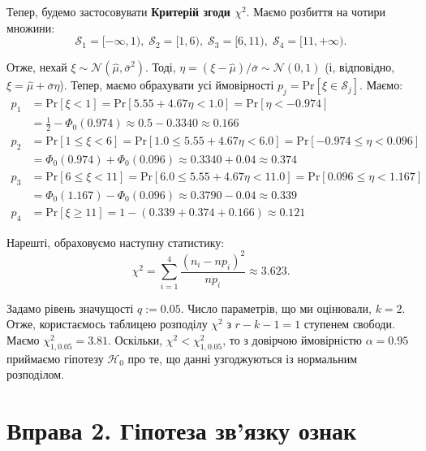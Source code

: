 \documentclass{../hw_template}
\begin{document}
Тепер, будемо застосовувати \textbf{Критерій згоди $\chi^2$}. Маємо розбиття на чотири множини: 
\begin{equation*}
    \mathcal{S}_1 =
[-\infty,1),\; \mathcal{S}_2 = [1,6),\; \mathcal{S}_3=[6,11),\;
\mathcal{S}_4=[11,+\infty).    
\end{equation*}

Отже, нехай $\xi \sim \mathcal{N}(\hat{\mu},\overline{\sigma}^2)$. Тоді, $\eta = (\xi - \hat{\mu})/\overline{\sigma} \sim \mathcal{N}(0,1)$ (і, відповідно, $\xi=\hat{\mu}+\overline{\sigma}\eta$). Тепер, маємо обрахувати усі ймовірності $p_j = \text{Pr}[\xi \in \mathcal{S}_j]$. Маємо:
\begin{align*}
    p_1 &= \text{Pr}[\xi < 1] = \text{Pr}[5.55 + 4.67\eta < 1.0] = \text{Pr}[\eta < -0.974] \\ 
        &= \frac{1}{2} - \Phi_0(0.974) \approx 0.5 - 0.3340 \approx 0.166 \\
    p_2 &= \text{Pr}[1 \leq \xi < 6] = \text{Pr}[1.0 \leq 5.55 + 4.67\eta < 6.0] = \text{Pr}[-0.974 \leq \eta < 0.096] \\
        &= \Phi_0(0.974) + \Phi_0(0.096) \approx 0.3340 + 0.04 \approx 0.374 \\
    p_3 &= \text{Pr}[6 \leq \xi < 11] = \text{Pr}[6.0 \leq 5.55 + 4.67\eta < 11.0] = \text{Pr}[0.096 \leq \eta < 1.167] \\
        &= \Phi_0(1.167) - \Phi_0(0.096) \approx 0.3790 - 0.04 \approx 0.339 \\
    p_4 &= \text{Pr}[\xi \geq 11] = 1 - (0.339 + 0.374 + 0.166) \approx 0.121
\end{align*}

Нарешті, обраховуємо наступну статистику:
\begin{equation*}
    \chi^2 = \sum_{i=1}^4\frac{(n_i-np_i)^2}{np_i} \approx 3.623.
\end{equation*}

Задамо рівень значущості $q:=0.05$. Число параметрів, що ми оцінювали, $k=2$. Отже, 
користаємось таблицею розподілу $\chi^2$ з $r-k-1=1$ ступенем свободи. Маємо
$\chi_{1,0.05}^2 = 3.81$. Оскільки, $\chi^2 < \chi_{1,0.05}^2$, то з довірчою
ймовірністю $\alpha=0.95$ приймаємо гіпотезу $\mathcal{H}_0$ про те, що 
данні узгоджуються із нормальним розподілом.

\newpage

\section{Вправа 2. Гіпотеза зв'язку ознак}
\end{document}
